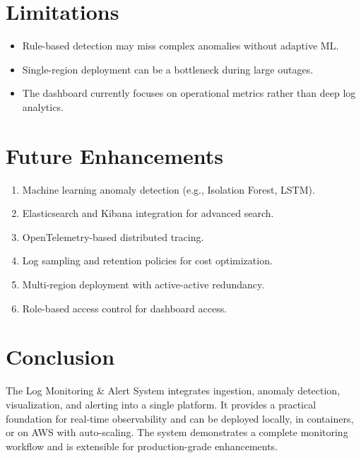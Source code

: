 \documentclass[11pt,a4paper]{article}
\begin{document}
\section{Limitations}
\begin{itemize}
  \item Rule-based detection may miss complex anomalies without adaptive ML.
  \item Single-region deployment can be a bottleneck during large outages.
  \item The dashboard currently focuses on operational metrics rather than deep log analytics.
\end{itemize}

\section{Future Enhancements}
\begin{enumerate}[label=\arabic*.]
  \item Machine learning anomaly detection (e.g., Isolation Forest, LSTM).
  \item Elasticsearch and Kibana integration for advanced search.
  \item OpenTelemetry-based distributed tracing.
  \item Log sampling and retention policies for cost optimization.
  \item Multi-region deployment with active-active redundancy.
  \item Role-based access control for dashboard access.
\end{enumerate}

\section{Conclusion}
The Log Monitoring \& Alert System integrates ingestion, anomaly detection, visualization, and alerting into a single platform. It provides a practical foundation for real-time observability and can be deployed locally, in containers, or on AWS with auto-scaling. The system demonstrates a complete monitoring workflow and is extensible for production-grade enhancements.
\end{document}
